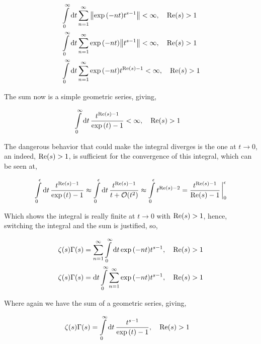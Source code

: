 \begin{align*}
    &\int\limits_0^\infty\dd{t}\sum\limits_{n=1}^\infty\norm{\exp\qty(-nt)t^{s-1}}<\infty,\ \ \ \textnormal{Re}\qty(s)>1\\
    &\int\limits_0^\infty\dd{t}\sum\limits_{n=1}^\infty\exp\qty(-nt)\norm{t^{s-1}}<\infty,\ \ \ \textnormal{Re}\qty(s)>1\\
    &\int\limits_0^\infty\dd{t}\sum\limits_{n=1}^\infty\exp\qty(-nt)t^{\textnormal{Re}\qty(s)-1}<\infty,\ \ \ \textnormal{Re}\qty(s)>1
\end{align*}

The sum now is a simple geometric series, giving,

\begin{align*}
    &\int\limits_0^\infty\dd{t}\frac{t^{\textnormal{Re}\qty(s)-1}}{\exp\qty(t)-1}<\infty,\ \ \ \textnormal{Re}\qty(s)>1
\end{align*}

The dangerous behavior that could make the integral diverges is the one at $t\rightarrow0$, an indeed, $\textnormal{Re}\qty(s)>1$, is 
sufficient for the convergence of this integral, which can be seen at,

\begin{align*}
    \int\limits_0^\epsilon\dd{t}\frac{t^{\textnormal{Re}\qty(s)-1}}{\exp\qty(t)-1}\approx\int\limits_0^\epsilon\dd{t}\frac{t^{\textnormal{Re}\qty(s)-1}}{t+\mathcal O\qty(t^2)}\approx\int\limits_0^\epsilon t^{\textnormal{Re}\qty(s)-2}=\frac{t^{\textnormal{Re}\qty(s)-1}}{\textnormal{Re}\qty(s)-1}\eval_0^\epsilon
\end{align*}

Which shows the integral is really finite at $t\rightarrow 0$ with $\textnormal{Re}\qty(s)>1$, hence, switching the integral and the 
sum is justified, so,

\begin{align*}
    \zeta(s)\Gamma\qty(s)&=\sum\limits_{n=1}^\infty\int\limits_0^\infty\dd{t}\exp\qty(-nt)t^{s-1},\ \ \ \textnormal{Re}\qty(s)>1\\
    \zeta(s)\Gamma\qty(s)&=\dd{t}\int\limits_0^\infty\sum\limits_{n=1}^\infty\exp\qty(-nt)t^{s-1},\ \ \ \textnormal{Re}\qty(s)>1
\end{align*}

Where again we have the sum of a geometric series, giving,

\begin{align*}
    \zeta(s)\Gamma\qty(s)&=\int\limits_0^\infty\dd{t}\frac{t^{s-1}}{\exp\qty(t)-1},\ \ \ \textnormal{Re}\qty(s)>1
\end{align*}

